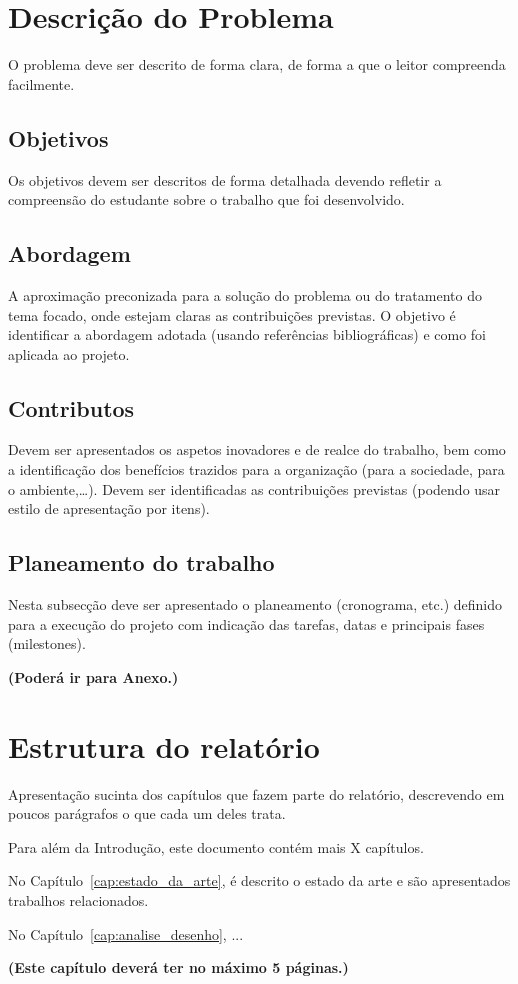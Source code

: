 \section{Descrição do Problema}
O problema deve ser descrito de forma clara, de forma a que o leitor compreenda facilmente.


\subsection{Objetivos} 
Os objetivos devem ser descritos de forma detalhada devendo refletir a compreensão do estudante sobre o trabalho que foi desenvolvido.


\subsection{Abordagem} 
A aproximação preconizada para a solução do problema ou do tratamento do tema focado, onde estejam claras as contribuições previstas. O objetivo é identificar a abordagem adotada (usando referências bibliográficas) e como foi aplicada ao projeto. 


\subsection{Contributos} 
Devem ser apresentados os aspetos inovadores e de realce do trabalho, bem como a identificação dos benefícios trazidos para a organização (para a sociedade, para o ambiente,…). Devem ser identificadas as contribuições previstas (podendo usar estilo de apresentação por itens). 


\subsection{Planeamento do trabalho}  
Nesta subsecção deve ser apresentado o planeamento (cronograma, etc.) definido para a execução do projeto com indicação das tarefas, datas e principais fases (milestones).

\textbf{(Poderá ir para Anexo.)}



\section{Estrutura do relatório}

Apresentação sucinta dos capítulos que fazem parte do relatório, descrevendo em poucos parágrafos o que cada um deles trata. 

Para além da Introdução, este documento contém mais X capítulos.

No Capítulo~\ref{cap:estado_da_arte}, é descrito o estado da arte e são apresentados trabalhos relacionados.

No Capítulo~\ref{cap:analise_desenho}, ...

\vspace{20mm} 

\textbf{(Este capítulo deverá ter no máximo 5 páginas.)}
